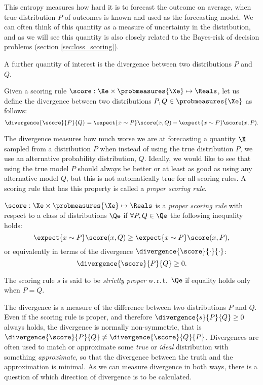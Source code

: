 This entropy measures how hard it is to forecast the outcome on average, when true distribution $P$ of outcomes is known and used as the forecasting model. We can often think of this quantity as a measure of uncertainty in the distribution, and as we will see this quantity is also closely related to the Bayes-risk of decision problems (section \ref{sec:loss_scoring}).

A further quantity of interest is the divergence between two distributions $P$ and $Q$.

\begin{definition}
Given a scoring rule $\score:\Xe\times\probmeasures{\Xe}\mapsto\Reals$, let us define the divergence between two distributions $P,Q\in\probmeasures{\Xe}$ as follows:
	\begin{equation}
		\divergence{\score}{P}{Q} = \expect{x\sim P} \score(x,Q) - \expect{x\sim P} \score(x,P)\mbox{.}\label{eqn:def_divergence}
	\end{equation}
\end{definition}

The divergence measures how much worse we are at forecasting a quantity $\X$ sampled from a distribution $P$ when instead of using the true distribution $P$, we use an alternative probability distribution, $Q$. Ideally, we would like to see that using the true model $P$ should always be better or at least as good as using any alternative model $Q$, but this is not automatically true for all scoring rules. A scoring rule that has this property is called a \emph{proper scoring rule}.

\begin{definition}
	$\score:\Xe\times\probmeasures{\Xe}\mapsto\Reals$ is a \emph{proper scoring rule} with respect to a class of distributions $\Qe$ if $\forall P,Q\in\Qe$ the following inequality holds:
	\begin{equation}
		\expect{x\sim P} \score(x,Q) \geq \expect{x\sim P} \score(x,P),
	\end{equation}
	or equivalently in terms of the divergence $\divergence{\score}{\cdot}{\cdot}$:
	\begin{equation}
		\divergence{\score}{P}{Q} \geq 0.
	\end{equation}
	
	The scoring rule $s$ is said to be \emph{strictly proper} w.\,r.\,t.\ $\Qe$ if equality holds only when $P=Q$.
\end{definition}

The divergence is a measure of the difference between two distributions $P$ and $Q$. Even if the scoring rule is proper, and therefore $\divergence{s}{P}{Q} \geq 0$ always holds, the divergence is normally non-symmetric, that is $\divergence{\score}{P}{Q} \neq \divergence{\score}{Q}{P}$. Divergences are often used to match or approximate some \emph{true} or \emph{ideal} distribution with something \emph{approximate}, so that the divergence between the truth and the approximation is minimal. As we can measure divergence in both ways, there is a question of which direction of divergence is to be calculated.

